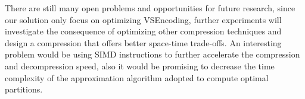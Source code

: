 \documentclass[runningheads,a4paper]{llncs}
\begin{document}
There are still many open problems and opportunities for future research, since our solution only focus on optimizing VSEncoding, further experiments will investigate the consequence of optimizing other compression techniques and design a compression that offers better space-time trade-offs. An interesting problem would be using SIMD instructions to further accelerate the compression and decompression speed, also it would be promising to decrease the time complexity of the approximation algorithm adopted to compute optimal partitions.



\end{document}
